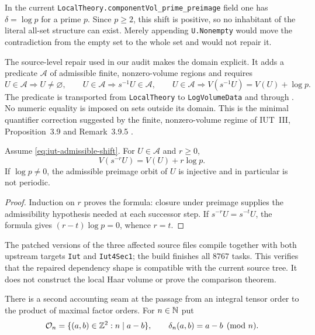 In the current \texttt{LocalTheory.componentVol\_prime\_preimage} field one
has $\delta=\log p$ for a prime $p$.  Since $p\ge2$, this shift is positive,
so no inhabitant of the literal all-set structure can exist.  Merely appending
\texttt{U.Nonempty} would move the contradiction from the empty set to the
whole set and would not repair it.

The source-level repair used in our audit makes the domain explicit.  It adds
a predicate $\mathcal A$ of admissible finite, nonzero-volume regions and
requires
\begin{equation}\label{eq:iut-admissible-shift}
 U\in\mathcal A\Longrightarrow U\ne\varnothing,\qquad
 U\in\mathcal A\Longrightarrow s^{-1}U\in\mathcal A,\qquad
 U\in\mathcal A\Longrightarrow V(s^{-1}U)=V(U)+\log p.
\end{equation}
The predicate is transported from \texttt{LocalTheory} to
\texttt{LogVolumeData} and through .  No
numeric equality is imposed on sets outside its domain.  This is the minimal
quantifier correction suggested by the finite, nonzero-volume regime of
IUT~III, Proposition~3.9 and Remark~3.9.5 \cite{IUT3}.

\begin{proposition}
\label{prop:iut-admissible-orbit-law}
Assume \eqref{eq:iut-admissible-shift}.  For $U\in\mathcal A$ and $r\ge0$,
\[
                    V(s^{-r}U)=V(U)+r\log p.
\]
If $\log p\ne0$, the admissible preimage orbit of $U$ is injective and in
particular is not periodic.
\end{proposition}

\begin{proof}
Induction on $r$ proves the formula: closure under preimage supplies the
admissibility hypothesis needed at each successor step.  If
$s^{-r}U=s^{-t}U$, the formula gives
$(r-t)\log p=0$, whence $r=t$.
\end{proof}

The patched versions of the three affected source files compile together
with both upstream targets \texttt{Iut} and \texttt{Iut4Sec1}; the build
finishes all $8767$ tasks.  This verifies that the repaired dependency shape
is compatible with the current source tree.  It does not construct the local
Haar volume or prove the comparison theorem.

There is a second accounting seam at the passage from an integral tensor
order to the product of maximal factor orders.  For $n\in\mathbb N$ put
\begin{equation}\label{eq:iut-congruence-order}
 \mathcal O_n=\{(a,b)\in\mathbb Z^2:n\mid a-b\},\qquad
 \delta_n(a,b)=a-b\pmod n.
\end{equation}

